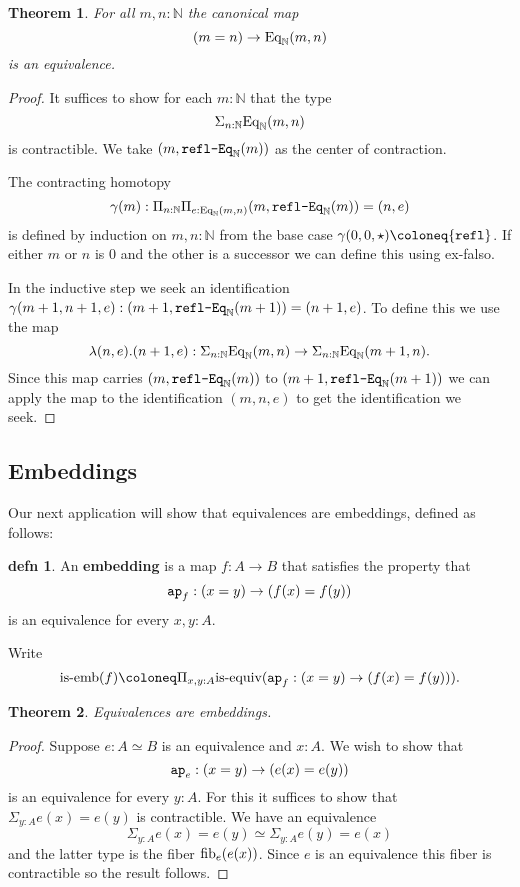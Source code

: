 \documentclass{amsart}
\theoremstyle{theorem}
\newtheorem*{thm}{Theorem}
\theoremstyle{definition}
\newtheorem*{defn}{defn}
\theoremstyle{remark}
\newcommand{\0}{\mathbbe{0}}
\newcommand{\1}{\mathbbe{1}}
\newcommand{\2}{\mathbbe{2}}
\newcommand{\3}{\mathbbe{3}}
\newcommand{\4}{\mathbbe{4}}
\newcommand{\term}[1]{{\textup{\texttt{#1}}}}
\newcommand{\type}[1]{{\textup{#1}}}
\newcommand{\bN}{{\mathbb{N}}}
\newcommand{\refl}{\term{refl}}
\newcommand{\ap}{\term{ap}}
\newcommand{\Eq}{\textup{\text{Eq}}}
\newcommand{\is}[1]{\type{is-{#1}}}
\newcommand{\fib}{\type{fib}}
\begin{document}
\begin{thm} For all $m,n : \bN$ the canonical map
\[ (m=n) \to \Eq_\bN(m,n)\] is an equivalence.
\end{thm}
\begin{proof}
It suffices to show for each $m : \bN$ that the type \[ \Sigma_{n : \bN} \Eq_\bN(m,n)\] is contractible. We take $(m,\term{refl-Eq}_\bN(m))$ as the center of contraction.

The contracting homotopy 
\[ \gamma(m) : \Pi_{n :\bN} \Pi_{e :\Eq_\bN(m,n)} (m,\term{refl-Eq}_\bN(m)) = (n,e)\]
is defined by induction on $m,n : \bN$ from the base case $\gamma(0,0, \star) \coloneq \refl$. If either $m$ or $n$ is 0 and the other is a successor we can define this using ex-falso. 

In the inductive step we seek an identification $\gamma(m+1,n+1,e) : (m+1, \term{refl-Eq}_\bN(m+1)) = (n+1,e)$. To define this we use the map
\[ \lambda(n,e).(n+1,e) : \Sigma_{n:\bN}\Eq_\bN(m,n) \to \Sigma_{n : \bN}\Eq_\bN(m+1,n).\]
Since this map carries $(m,\term{refl-Eq}_\bN(m))$ to $(m+1,\term{refl-Eq}_\bN(m+1))$ we can apply the map to the identification $(m,n,e)$ to get the identification we seek.
\end{proof}

\subsection*{Embeddings}

Our next application will show that equivalences are embeddings, defined as follows:

\begin{defn} An \textbf{embedding} is a map $f \colon A \to B$ that satisfies the property that 
\[ \ap_f : (x=y) \to (f(x)=f(y))\]
is an equivalence for every $x,y :A$.
\end{defn}

Write 
\[ \is{emb}(f) \coloneq \Pi_{x,y:A} \is{equiv}(\ap_f : (x=y) \to (f(x)=f(y))).\]

\begin{thm} Equivalences are embeddings.
\end{thm}
\begin{proof}
Suppose $e : A \simeq B$ is an equivalence and $x:A$. We wish to show that 
\[ \ap_e : (x=y) \to (e(x)=e(y))\] is an equivalence for every $y :A$. For this it suffices to show that $\Sigma_{y:A}e(x) =e(y)$ is contractible. We have an equivalence
\[ \Sigma_{y:A}e(x)=e(y) \simeq \Sigma_{y:A} e(y) = e(x)\]
and the latter type is the fiber $\fib_e(e(x))$. Since $e$ is an equivalence this fiber is contractible so the result follows.
\end{proof}
\end{document}
